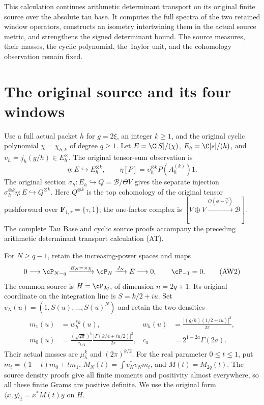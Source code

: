 \documentclass[10pt,a4paper,oneside]{report}
\begin{document}
This calculation continues arithmetic determinant transport on its original
finite source over the absolute tau base. It computes the full spectra of
the two retained window operators, constructs an isometry intertwining
them in the actual source metric, and strengthens the signed determinant
bound. The source measures, their masses, the cyclic polynomial, the
Taylor unit, and the cohomology observation remain fixed.

\section{The original source and its four windows}

Use a full actual packet $h$ for $g=2\xi$, an integer $k\ge1$, and the
original cyclic polynomial $\chi=\chi_{h,k}$ of degree $q\ge1$.
Let $E=\C[S]/(\chi)$, $E_h=\C[s]/(h)$, and
$\upsilon_h=j_h(g/h)\in E_h^\times$.
The original tensor-sum observation is
\[
 \eta:E\hookrightarrow E_h^{\otimes k},\qquad
 \eta[P]=\upsilon_h^{\otimes k}P(A_h^{(k)})1.
 \tag{AW1}
\]
The original section $\sigma_h:E_h\hookrightarrow
Q=\mathscr B/\Theta V$ gives the separate injection
$\sigma_h^{\otimes k}\eta:E\hookrightarrow Q^{\otimes k}$.
Here $Q^{\otimes k}$ is the top cohomology of the original tensor
pushforward over $\mathbf F_{1,\tau}=\{\tau,1\}$; the one-factor
complex is $[V\oplus V\xrightarrow{\Theta(\phi-\widehat\psi)}
\mathscr B]$. The complete Tau Base and cyclic source proofs accompany
the preceding arithmetic determinant transport calculation (AT).

For $N\ge q-1$, retain the increasing-power spaces and maps
\[
 0\longrightarrow\cP_{N-q}\xrightarrow{B_N=\times\chi}
 \cP_N\xrightarrow{J_N}E\longrightarrow0,
 \qquad \cP_{-1}=0.
 \tag{AW2}
\]
The common source is $H=\cP_{2q}$, of dimension $n=2q+1$.
Its original coordinate on the integration line is $S=k/2+iu$.
Set $v_N(u)=(1,S(u),\ldots,S(u)^N)$ and retain the two densities
\[
 \begin{aligned}
 m_1(u)&=w_h^{*k}(u),&
 w_h(u)&=\frac{|(g/h)(1/2+iu)|^2}{2\pi},\\
 m_0(u)&=\frac{(\sqrt{2\pi})^k}{c_{k/4}}
              \frac{|\Gamma(k/4+iu/2)|^2}{2\pi},&
 c_a&=2^{1-2a}\Gamma(2a).
 \end{aligned}
 \tag{AW3}
\]
Their actual masses are $\mu_h^k$ and $(2\pi)^{k/2}$.
For the real parameter $0\le t\le1$, put
$m_t=(1-t)m_0+tm_1$, $M_N(t)=\int v_N^*v_Nm_t$, and
$M(t)=M_{2q}(t)$. The source density proofs give all finite moments
and positivity almost everywhere, so all these finite Grams are
positive definite. We use the original form
$\langle x,y\rangle_t=x^*M(t)y$ on $H$.
\end{document}
